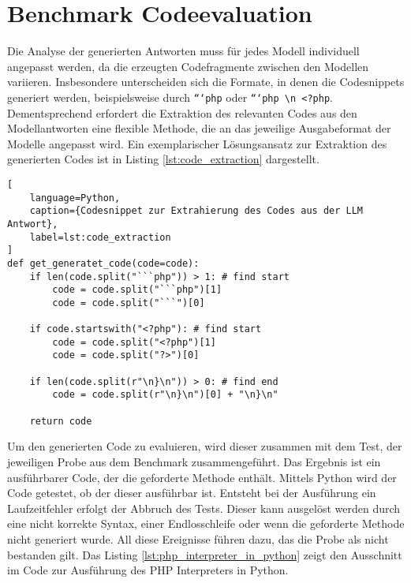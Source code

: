 \section{Benchmark Codeevaluation}\label{sec:benchmark_evaluation}
Die Analyse der generierten Antworten muss für jedes Modell individuell angepasst werden, da die erzeugten Codefragmente zwischen den Modellen variieren. Insbesondere unterscheiden sich die Formate, in denen die Codesnippets generiert werden, beispielsweise durch \texttt{```php} oder \texttt{```php \textbackslash n <?php}. Dementsprechend erfordert die Extraktion des relevanten Codes aus den Modellantworten eine flexible Methode, die an das jeweilige Ausgabeformat der Modelle angepasst wird. Ein exemplarischer Lösungsansatz zur Extraktion des generierten Codes ist in Listing \ref{lst:code_extraction} dargestellt.\vspace{0.2cm}

\begin{lstlisting}[
	language=Python,
	caption={Codesnippet zur Extrahierung des Codes aus der LLM Antwort},
	label=lst:code_extraction
]
def get_generatet_code(code=code):
    if len(code.split("```php")) > 1: # find start
        code = code.split("```php")[1]
        code = code.split("```")[0]

    if code.startswith("<?php"): # find start
        code = code.split("<?php")[1]
        code = code.split("?>")[0]

    if len(code.split(r"\n}\n")) > 0: # find end
        code = code.split(r"\n}\n")[0] + "\n}\n"

    return code
\end{lstlisting}

Um den generierten Code zu evaluieren, wird dieser zusammen mit dem Test, der jeweiligen Probe aus dem Benchmark zusammengeführt. Das Ergebnis ist ein ausführbarer Code, der die geforderte Methode enthält. Mittels Python wird der Code getestet, ob der dieser ausführbar ist. Entsteht bei der Ausführung ein Laufzeitfehler erfolgt der Abbruch des Tests. Dieser kann ausgelöst werden durch eine nicht korrekte Syntax, einer Endlosschleife oder wenn die geforderte Methode nicht generiert wurde. All diese Ereignisse führen dazu, das die Probe als nicht bestanden gilt. Das Listing \ref{lst:php_interpreter_in_python} zeigt den Ausschnitt im Code zur Ausführung des PHP Interpreters in Python.\vspace{0.2cm}

